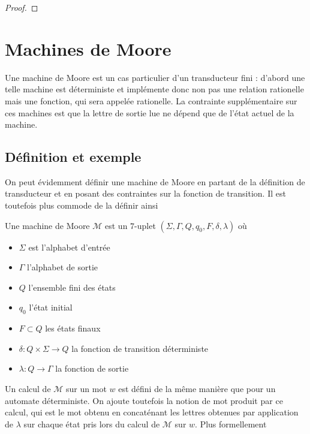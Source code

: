 \documentclass{scrartcl}
\begin{document}
\begin{flushleft}
\begin{proof}
\end{proof}

\section{Machines de Moore}

Une machine de Moore est un cas particulier d'un transducteur fini : d'abord une telle machine est déterministe
et implémente donc non pas une relation rationelle mais une fonction, qui sera appelée rationelle. La contrainte
supplémentaire sur ces machines est que la lettre de sortie lue ne dépend que de l'état actuel de la machine.

\subsection{Définition et exemple}

On peut évidemment définir une machine de Moore en partant de la définition de transducteur et en posant des
contraintes sur la fonction de transition. Il est toutefois plus commode de la définir ainsi

\begin{define}
    Une machine de Moore $\mathcal{M}$ est un $7$-uplet $(\Sigma, \Gamma, Q, q_0, F, \delta, \lambda)$ où
    \begin{itemize}
        \item $\Sigma$ est l'alphabet d'entrée
        \item $\Gamma$ l'alphabet de sortie
        \item $Q$ l'ensemble fini des états
        \item $q_0$ l'état initial
        \item $F \subset Q$ les états finaux
        \item $\delta : Q \times \Sigma \rightarrow Q$ la fonction de transition déterministe
        \item $\lambda : Q \rightarrow \Gamma$ la fonction de sortie
    \end{itemize}
\end{define}

Un calcul de $\mathcal{M}$ sur un mot $w$ est défini de la même manière que pour un automate déterministe. On ajoute
toutefois la notion de mot produit par ce calcul, qui est le mot obtenu en concaténant les lettres obtenues
par application de $\lambda$ sur chaque état pris lors du calcul de $\mathcal{M}$ sur $w$. Plus formellement


\end{flushleft}
\end{document}
